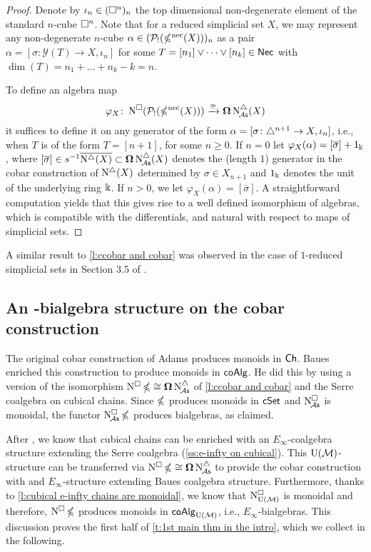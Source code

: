 \begin{proof}
	Denote by $\iota_n \in (\square^n)_n$ the top dimensional non-degenerate element of the standard $n$-cube $\square^n$.
	Note that for a reduced simplicial set $X$, we may represent any non-degenerate $n$-cube $\alpha \in (\mathcal{P}_!(\operatorname{\mathbb{\Omega}^{\mathrm{nec}}}(X)))_n$ as a pair $\alpha = [\sigma \colon \mathcal{Y}(T) \to X, \iota_n]$ for some $T = [n_1] \vee \dots \vee [n_k] \in \mathsf{Nec}$ with $\dim(T) = n_1 + \dots + n_k - k = n$.

	To define an algebra map
	\[
	\varphi_X \colon \operatorname{N^{\square}}(\mathcal{P}_!(\operatorname{\mathbb{\Omega}^{\mathrm{nec}}}(X))) \xrightarrow{\cong} \operatorname{\mathbf{\Omega}} \operatorname{N^{\triangle}_{\!{\mathcal{A}\mathsf{s}}}}(X)
	\]
	it suffices to define it on any generator of the form $\alpha=[\sigma \colon \triangle^{n+1} \to X, \iota_{n}]$, i.e., when $T$ is of the form $T = [n+1]$, for some $n \geq 0$.
	If $n = 0$ let $\varphi_X(\alpha)= [\overline{\sigma}] + 1_\Bbbk$, where $[\overline{\sigma}] \in s^{-1} \overline{ \operatorname{N^{\triangle}}(X)} \subset \operatorname{\mathbf{\Omega}} \operatorname{N^{\triangle}_{\!{\mathcal{A}\mathsf{s}}}}(X)$ denotes the (length $1$) generator in the cobar construction of $\operatorname{N^{\triangle}}(X)$ determined by $\sigma \in X_{n+1}$ and $1_\Bbbk$ denotes the unit of the underlying ring $\Bbbk$.
	If $n > 0$, we let $\varphi_X(\alpha)=[\overline{\sigma}]$.
	A straightforward computation yields that this gives rise to a well defined isomorphism of algebras, which is compatible with the differentials, and natural with respect to maps of simplicial sets.
\end{proof}
A similar result to \cref{l:ccobar and cobar} was observed in the case of $1$-reduced simplicial sets in Section 3.5 of \cite{berger1995loops}.

\subsection{An \pdfEinfty-bialgebra structure on the cobar construction} \label{ss:e-infty on cobar}

The original cobar construction of Adams produces monoids in $\mathsf{Ch}$.
Baues enriched this construction to produce monoids in $\mathsf{coAlg}$.
He did this by using a version of the isomorphism $\operatorname{N^{\square}} \operatorname{\mathbb{\Omega}} \cong \operatorname{\mathbf{\Omega}} \operatorname{N^{\triangle}_{\!{\mathcal{A}\mathsf{s}}}}$ of \cref{l:ccobar and cobar} and the Serre coalgebra on cubical chains.
Since $\operatorname{\mathbb{\Omega}}$ produces monoids in $\mathsf{cSet}$ and $\operatorname{N^{\square}_{\!{\mathcal{A}\mathsf{s}}}}$ is monoidal, the functor $\operatorname{N^{\square}_{\!{\mathcal{A}\mathsf{s}}}} \operatorname{\mathbb{\Omega}}$ produces bialgebras, as claimed.

After \cite{medina2021cubical}, we know that cubical chains can be enriched with an $E_\infty$-coalgebra structure extending the Serre coalgebra (\cref{ss:e-infty on cubical}).
This ${\operatorname{U}(\mathcal{M})}$-structure can be transferred via $\operatorname{N^{\square}} \operatorname{\mathbb{\Omega}} \cong \operatorname{\mathbf{\Omega}} \operatorname{N^{\triangle}_{\!{\mathcal{A}\mathsf{s}}}}$ to provide the cobar construction with and $E_\infty$-structure extending Baues coalgebra structure.
Furthermore, thanks to \cref{l:cubical e-infty chains are monoidal}, we know that $\operatorname{N^{\square}_{{\operatorname{U}(\mathcal{M})}}}$ is monoidal and therefore, $\operatorname{N^{\square}} \operatorname{\mathbb{\Omega}}$ produces monoids in $\mathsf{coAlg}_{{\operatorname{U}(\mathcal{M})}}$, i.e., $E_\infty$-bialgebras.
This discussion proves the first half of \cref{t:1st main thm in the intro}, which we collect in the following.

